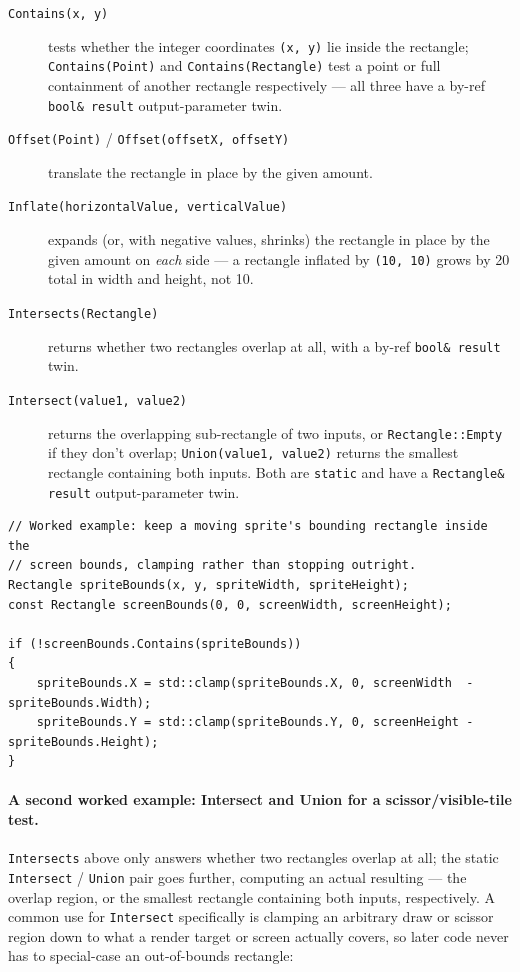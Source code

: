 \begin{description}
\item[\texttt{Contains(x, y)}] tests whether the integer coordinates \texttt{(x, y)} lie
  inside the rectangle; \texttt{Contains(Point)} and \texttt{Contains(Rectangle)} test a point
  or full containment of another rectangle respectively --- all three have a by-ref
  \texttt{bool\& result} output-parameter twin.
\item[\texttt{Offset(Point)} / \texttt{Offset(offsetX, offsetY)}] translate the rectangle in
  place by the given amount.
\item[\texttt{Inflate(horizontalValue, verticalValue)}] expands (or, with negative values,
  shrinks) the rectangle in place by the given amount on \emph{each} side --- a rectangle
  inflated by \texttt{(10, 10)} grows by 20 total in width and height, not 10.
\item[\texttt{Intersects(Rectangle)}] returns whether two rectangles overlap at all, with a
  by-ref \texttt{bool\& result} twin.
\item[\texttt{Intersect(value1, value2)}] returns the overlapping sub-rectangle of two inputs,
  or \texttt{Rectangle::Empty} if they don't overlap; \texttt{Union(value1, value2)} returns
  the smallest rectangle containing both inputs. Both are \texttt{static} and have a
  \texttt{Rectangle\& result} output-parameter twin.
\end{description}

\begin{lstlisting}
// Worked example: keep a moving sprite's bounding rectangle inside the
// screen bounds, clamping rather than stopping outright.
Rectangle spriteBounds(x, y, spriteWidth, spriteHeight);
const Rectangle screenBounds(0, 0, screenWidth, screenHeight);

if (!screenBounds.Contains(spriteBounds))
{
    spriteBounds.X = std::clamp(spriteBounds.X, 0, screenWidth  - spriteBounds.Width);
    spriteBounds.Y = std::clamp(spriteBounds.Y, 0, screenHeight - spriteBounds.Height);
}
\end{lstlisting}

\paragraph{A second worked example: Intersect and Union for a scissor/visible-tile test.}
\texttt{Intersects} above only answers whether two rectangles overlap at all; the static
\texttt{Intersect} / \texttt{Union} pair goes further, computing an actual resulting
 --- the overlap region, or the smallest rectangle containing both inputs,
respectively. A common use for \texttt{Intersect} specifically is clamping an arbitrary
draw or scissor region down to what a render target or screen actually covers, so later code
never has to special-case an out-of-bounds rectangle:


